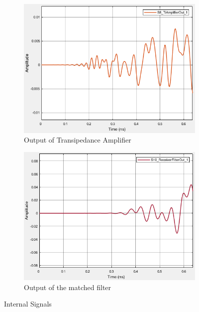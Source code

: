 \begin{figure}[H]
	\centering
	\begin{subfigure}{0.3\textwidth}
		\centering
		\includegraphics[scale=0.3]{./lib/m_qam_receiver/figures/amp_out.png}
		\caption{Output of Transipedance Amplifier}
		\label{fig:Ti_out}
	\end{subfigure}
	\begin{subfigure}{0.3\textwidth}
		\centering
		\includegraphics[scale=0.3]{./lib/m_qam_receiver/figures/matched_out.png}
		\caption{Output of the matched filter}
		\label{fig:matched_out}
	\end{subfigure}
\caption{Internal Signals}
\label{fig:internal_signals_part2}
\end{figure}


